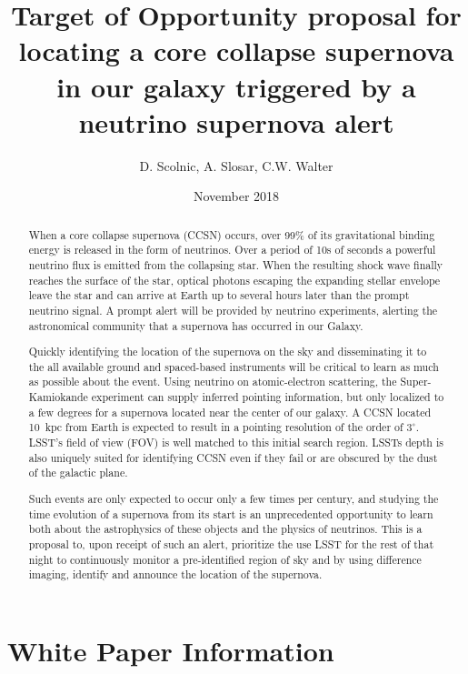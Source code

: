 \documentclass[11pt]{article}
\title{Target of Opportunity proposal for locating a core collapse
  supernova in our galaxy triggered by a neutrino supernova alert}
\author{D. Scolnic, A. Slosar, C.W. Walter}
\date{ November 2018}
\begin{document}
\maketitle

\begin{abstract}

  When a core collapse supernova (CCSN) occurs, over 99\% of its
  gravitational binding energy is released in the form of neutrinos.
  Over a period of 10s of seconds a powerful neutrino flux is emitted
  from the collapsing star.  When the resulting shock wave finally
  reaches the surface of the star, optical photons escaping the
  expanding stellar envelope leave the star and can arrive at Earth up
  to several hours later than the prompt neutrino signal.  A prompt
  alert will be provided by neutrino experiments, alerting the
  astronomical community that a supernova has occurred in our Galaxy.

  Quickly identifying the location of the supernova on the sky and
  disseminating it to the all available ground and spaced-based
  instruments will be critical to learn as much as possible about the
  event. Using neutrino on atomic-electron scattering, the
  Super-Kamiokande experiment can supply inferred pointing
  information, but only localized to a few degrees for a supernova
  located near the center of our galaxy.  A CCSN located 10~kpc from
  Earth is expected to result in a pointing resolution of the order of
  $3^\circ$.  LSST's field of view (FOV) is well matched to this
  initial search region.  LSSTs depth is also uniquely suited for
  identifying CCSN even if they fail or are obscured by the dust of
  the galactic plane.

  Such events are only expected to occur only a few times per century,
  and studying the time evolution of a supernova from its start is an
  unprecedented opportunity to learn both about the astrophysics of
  these objects and the physics of neutrinos.  This is a proposal to,
  upon receipt of such an alert, prioritize the use LSST for the rest of that night
  to continuously monitor a pre-identified region of sky and by using
  difference imaging, identify and announce the location of the
  supernova.
  
\end{abstract}

\section{White Paper Information}
\end{document}
